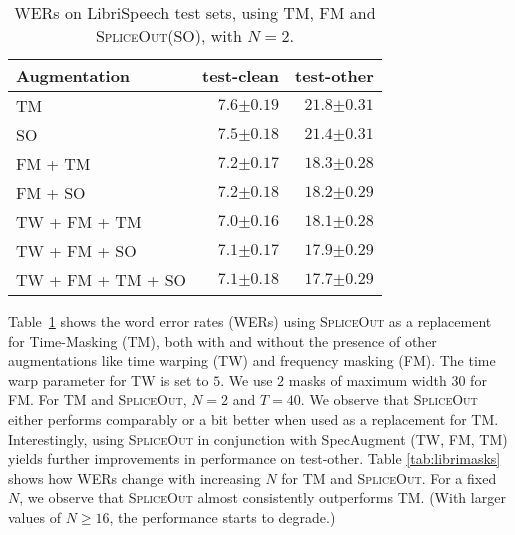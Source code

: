 \documentclass{article}
\newcommand{\SpA}{{\textsc{SpliceOut}}\xspace}
\begin{document}
\begin{table}
\centering
    \caption{WERs on LibriSpeech test sets, using TM, FM and \SpA (SO), with $N=2$.}
    \begin{tabular}{lrr}
    \toprule
     Augmentation & test-clean & test-other\\
    \midrule
    TM & $7.6{\scriptstyle \pm 0.19}$ & $21.8{\scriptstyle \pm 0.31}$\\
    SO & $\mathbf{7.5}{\scriptstyle \pm 0.18}$ & $\mathbf{21.4}{\scriptstyle \pm 0.31}$\\
    \midrule
    FM + TM & $\mathbf{7.2}{\scriptstyle \pm 0.17}$ & $18.3{\scriptstyle \pm 0.28}$\\
    FM + SO & $\mathbf{7.2}{\scriptstyle \pm 0.18}$ & $\mathbf{18.2}{\scriptstyle \pm 0.29}$\\
    \midrule
    TW + FM + TM~\citep{specaugment,espnet} & $\mathbf{7.0}{\scriptstyle \pm 0.16}$ & $18.1{\scriptstyle \pm 0.28}$\\
    TW + FM + SO & $7.1{\scriptstyle \pm 0.17}$ & $17.9{\scriptstyle \pm 0.29}$\\
    TW + FM + TM + SO & $7.1{\scriptstyle \pm 0.18}$  & $\mathbf{17.7}{\scriptstyle \pm 0.29}$\\
    \bottomrule
    \end{tabular}
    \label{tab:libriaugs}
\end{table}


Table~\ref{tab:libriaugs} shows the word error rates (WERs) using \SpA as a replacement for Time-Masking (TM), both with and without the presence of other augmentations like time warping (TW) and frequency masking (FM). The time warp parameter for TW is set to $5$. We use $2$ masks of maximum width $30$ for FM. For TM and \SpA, $N=2$ and $T=40$. We observe that \SpA either performs comparably or a bit better when used as a replacement for TM. Interestingly, using \SpA in conjunction with SpecAugment (TW, FM, TM) yields further improvements in performance on test-other. Table \ref{tab:librimasks} shows how WERs change with increasing $N$ for TM and \SpA. For a fixed $N$, we observe that \SpA almost consistently outperforms TM. (With larger values of $N \ge 16$, the performance starts to degrade.)
\end{document}

